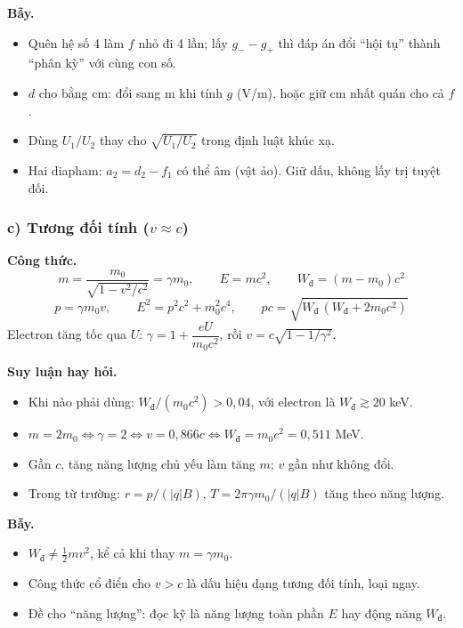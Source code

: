 \documentclass[11pt,a4paper]{article}
\newcommand{\Wd}{W_{\text{đ}}}
\begin{document}
\textbf{Bẫy.}
\begin{itemize}
    \item Quên hệ số 4 làm $f$ nhỏ đi 4 lần; lấy $g_--g_+$ thì đáp án đổi ``hội tụ'' thành ``phân kỳ'' với cùng con số.
    \item $d$ cho bằng cm: đổi sang m khi tính $g$ (V/m), hoặc giữ cm nhất quán cho cả $f$.
    \item Dùng $U_1/U_2$ thay cho $\sqrt{U_1/U_2}$ trong định luật khúc xạ.
    \item Hai diapham: $a_2=d_2-f_1$ có thể âm (vật ảo). Giữ dấu, không lấy trị tuyệt đối.
\end{itemize}

\subsubsection*{c) Tương đối tính ($v\approx c$)}

\textbf{Công thức.}
\begin{equation*}
    m=\frac{m_0}{\sqrt{1-v^2/c^2}}=\gamma m_0,\qquad E=mc^2,\qquad \Wd=(m-m_0)c^2
\end{equation*}
\begin{equation*}
    p=\gamma m_0v,\qquad E^2=p^2c^2+m_0^2c^4,\qquad pc=\sqrt{\Wd\,(\Wd+2m_0c^2)}
\end{equation*}
Electron tăng tốc qua $U$: $\gamma=1+\dfrac{eU}{m_0c^2}$, rồi $v=c\sqrt{1-1/\gamma^2}$.

\textbf{Suy luận hay hỏi.}
\begin{itemize}
    \item Khi nào phải dùng: $\Wd/(m_0c^2)>0{,}04$, với electron là $\Wd\gtrsim20$ keV.
    \item $m=2m_0\iff\gamma=2\iff v=0{,}866c\iff\Wd=m_0c^2=0{,}511$ MeV.
    \item Gần $c$, tăng năng lượng chủ yếu làm tăng $m$; $v$ gần như không đổi.
    \item Trong từ trường: $r=p/(|q|B)$, $T=2\pi\gamma m_0/(|q|B)$ tăng theo năng lượng.
\end{itemize}

\textbf{Bẫy.}
\begin{itemize}
    \item $\Wd\ne\frac12mv^2$, kể cả khi thay $m=\gamma m_0$.
    \item Công thức cổ điển cho $v>c$ là dấu hiệu dạng tương đối tính, loại ngay.
    \item Đề cho ``năng lượng'': đọc kỹ là năng lượng toàn phần $E$ hay động năng $\Wd$.
\end{itemize}
\end{document}
